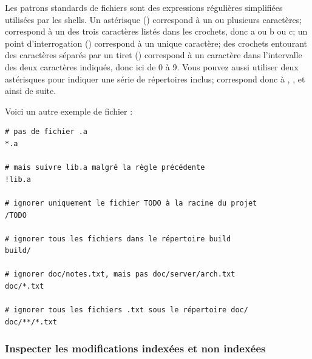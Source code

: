 Les patrons standards de fichiers sont des expressions régulières simplifiées utilisées par les shells.
Un astérisque (\code{*}) correspond à un ou plusieurs caractères; \code{[abc]} correspond à un des trois caractères listés dans les crochets, donc a ou b ou c; un point d'interrogation () correspond à un unique caractère; des crochets entourant des caractères séparés par un tiret (\code{[0-9]}) correspond à un caractère dans l'intervalle des deux caractères indiqués, donc ici de 0 à 9.
Vous pouvez aussi utiliser deux astérisques pour indiquer une série de répertoires inclus;  correspond donc à , ,  et ainsi de suite.

Voici un autre exemple de fichier :
\begin{Schunk}
\begin{Verbatim}
# pas de fichier .a
*.a

# mais suivre lib.a malgré la règle précédente
!lib.a

# ignorer uniquement le fichier TODO à la racine du projet
/TODO

# ignorer tous les fichiers dans le répertoire build
build/

# ignorer doc/notes.txt, mais pas doc/server/arch.txt
doc/*.txt

# ignorer tous les fichiers .txt sous le répertoire doc/
doc/**/*.txt
\end{Verbatim}
\end{Schunk}


\subsubsection{Inspecter les modifications indexées et non indexées}
\label{sec:git:diff_staged}


